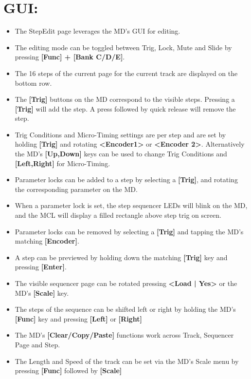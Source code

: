 \section{GUI:}
\begin{itemize}
\item The StepEdit page leverages the MD's GUI for editing.
\item The editing mode can be toggled between Trig, Lock, Mute and Slide by pressing \textbf{[Func] + [Bank C/D/E]}.
\item The 16 steps of the current page for the current track are displayed on the bottom row.
\item The \textbf{[Trig]} buttons on the MD correspond to the visible steps. Pressing a \textbf{[Trig]} will add the step. A press followed by quick release will remove the step. 
\item Trig Conditions and Micro-Timing settings are per step and are set by holding \textbf{[Trig]} and rotating \textbf{<Encoder1>} or \textbf{<Encoder 2>}. Alternatively the MD's \textbf{[Up,Down]} keys can be used to change Trig Conditions and \textbf{[Left,Right]} for Micro-Timing.
\item Parameter locks can be added to a step by selecting a \textbf{[Trig]}, and rotating the corresponding parameter on the MD.
\item When a parameter lock is set, the step sequencer LEDs will blink on the MD, and the MCL will display a filled rectangle above step trig on screen.
\item Parameter locks can be removed by selecting a \textbf{[Trig]} and tapping the MD's matching \textbf{[Encoder]}.
\item A step can be previewed by holding down the matching \textbf{[Trig]} key and pressing \textbf{[Enter]}.
\item The visible sequencer page can be rotated pressing \textbf{<Load | Yes>} or the MD's \textbf{[Scale]} key.
\item The steps of the sequence can be shifted left or right by holding the MD's \textbf{[Func]} key and pressing \textbf{[Left]} or \textbf{[Right]}
\item The MD's \textbf{[Clear/Copy/Paste]} functions work across Track, Sequencer Page and Step.
\item The Length and Speed of the track can be set via the MD's Scale menu by pressing \textbf{[Func]} followed by \textbf{[Scale]}

\end{itemize}

